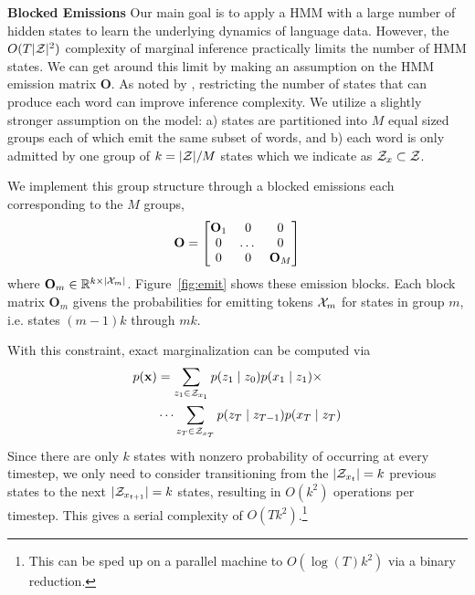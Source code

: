 \documentclass[11pt,a4paper]{article}
\begin{document}
\vspace{0.2cm}


\noindent
\textbf{Blocked Emissions}  Our main goal is to apply a HMM with a large number of hidden states to 
learn the underlying dynamics of language data. However, the $O(T|\mathcal{Z}|^2)$ complexity of marginal inference practically limits the number of HMM states. We can get around this limit by making an assumption on the HMM emission matrix $\mathbf{O}$. As noted by \citet{dedieu2019learning}, 
restricting the number of states that can produce each word can improve inference complexity. 
We utilize a slightly stronger assumption on the model: a) states are partitioned into $M$ equal sized groups each of which emit the same subset of words,  and b) each word is only admitted by one group of $k= |\mathcal{Z}| / M$ states which we indicate as $\mathcal{Z}_x \subset {\cal Z}$. 




We implement this group structure through a blocked emissions each corresponding to the $M$ groups,
\[\mathbf{O} = \begin{bmatrix} \mathbf{O}_1 & 0 & 0 \\ 0 & $\dots$ & 0 \\ 0 & 0 & \mathbf{O}_M \\
\end{bmatrix}\]
where $\mathbf{O}_m \in \mathbb{R}^{ k \times |\mathcal{X}_m|}$. Figure~\ref{fig:emit} shows these emission blocks. Each block matrix $\mathbf{O}_m$ givens the probabilities for emitting tokens $\mathcal{X}_m$ for states
in group $m$, i.e. states $(m-1)k$ through $mk$.

With this constraint, exact marginalization can be computed via 
\begin{equation}
\label{eqn:sparse_marginalization}
\begin{aligned}
p(\mathbf{x}) &= \sum_{z_1 \in \mathcal{Z}_{x_1}} p(z_1\mid z_0)p(x_1 \mid z_1) \times\\
    &\cdots
    \sum_{z_T \in \mathcal{Z}_{x_T}} p(z_T \mid z_{T-1})p(x_T \mid z_T)
\end{aligned}
\end{equation}
Since there are only $k$ states with nonzero probability of occurring
at every timestep, we only need to consider transitioning from the $|\mathcal{Z}_{x_t}| = k$
previous states to the next $|\mathcal{Z}_{x_{t+1}}|=k$ states,
resulting in $O(k^2)$ operations per timestep.
This gives a serial complexity of $O(Tk^2)$.\footnote{
This can be sped up on a parallel machine to $O(\log(T)k^2)$
via a binary reduction.
}
\end{document}

